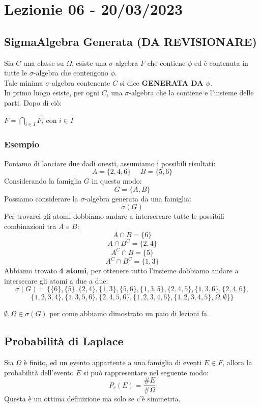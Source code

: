 \section{Lezionie 06 - 20/03/2023}

\subsection{SigmaAlgebra Generata (DA REVISIONARE)}
Sia $C$ una classe su $\Omega$, esiste una $\sigma$-algebra $F$ che contiene $\phi$ ed è contenuta in tutte le $\sigma$-algebra che contengono $\phi$.\\
Tale minima $\sigma$-algebra contenente $C$ si dice \textbf{GENERATA DA $\phi$}.\\
In primo luogo esiste, per ogni $C$, una $\sigma$-algebra che la contiene e l'insieme delle parti.
Dopo di ciò:\\
\begin{center}
$ F = \bigcap_{i \in I} F_i $ con $i \in I$
\end{center}

\subsubsection{Esempio}
Poniamo di lanciare due dadi onesti, assumiamo i possibili risultati:
$$ A = \{2,4,6\} \:\:\:\:\:\: B=\{5,6\}$$
Considerando la famiglia $G$ in questo modo:
$$ G = \{A,B\}$$
Possiamo considerare la $\sigma$-algebra generata da una famiglia:
$$ \sigma(G)$$
Per trovarci gli atomi dobbiamo andare a intersercare tutte le possibili combinazioni tra $A$ e $B$:\\
$$ A \cap B = \{6\}$$
$$ A \cap B^C = \{2,4\}$$
$$ A^C \cap B = \{5\}$$
$$ A^C \cap B^C = \{1,3\}$$
Abbiamo trovato \textbf{4 atomi}, per ottenere tutto l'insieme dobbiamo andare a intersecare gli atomi a due a due:
$$ \sigma(G) = \{ \{6\},  \{5\}, \{2,4\},  \{1,3\}, \{5,6\}, \{1,3,5\}, \{2,4,5\}, \{1,3,6\}, \{2,4,6\}, $$ 
$$ \{1,2,3,4\}, \{1,3,5,6\}, \{2,4,5,6\}, \{1,2,3,4,6\}, \{1,2,3,4,5\}, \Omega, \emptyset \}\}  $$
\begin{center}
$ \emptyset,\Omega \in \sigma(G)$ per come abbiamo dimostrato un paio di lezioni fa.
\end{center}

\subsection{Probabilità di Laplace}
Sia $\Omega$ è finito, ed un evento appartente a una famiglia di eventi $E \in F$, allora la probabilità dell'evento $E$ si può rappresentare nel seguente modo:
$$ P_c(E) = \frac{\#E}{\#\Omega} $$
Questa è un ottima definizione ma solo se c'è simmetria.

